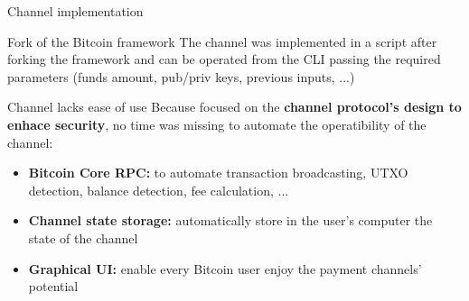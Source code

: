 \documentclass{beamer}
\begin{document}
\begin{frame}{Channel implementation}
 \begin{block}{Fork of the Bitcoin framework}
  The channel was implemented in a script after forking the framework and can be operated from the CLI passing the required parameters (funds amount, pub/priv keys, previous inputs, ...)
 \end{block}
 \pause
 \begin{alertblock}{Channel lacks ease of use}
  Because focused on the \textbf{channel protocol's design to enhace security}, no time was missing to automate the operatibility of the channel:
  \begin{itemize}[<+->]
   \item \textbf{Bitcoin Core RPC:} to automate transaction broadcasting, UTXO detection, balance detection, fee calculation, ...
   \item \textbf{Channel state storage:} automatically store in the user's computer the state of the channel
   \item \textbf{Graphical UI:} enable every Bitcoin user enjoy the payment channels' potential
  \end{itemize}
 \end{alertblock}
\end{frame}
\end{document}

